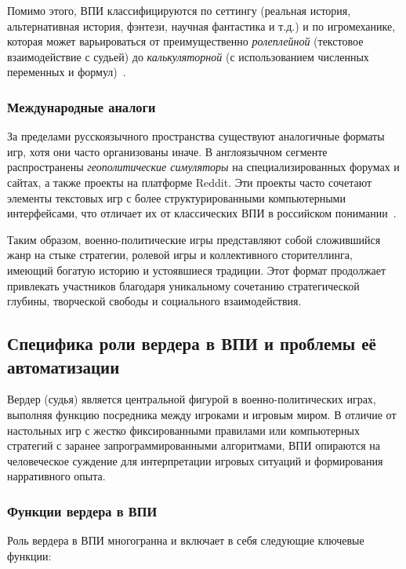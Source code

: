 Помимо этого, ВПИ классифицируются по сеттингу (реальная история, альтернативная история, фэнтези, научная фантастика и т.д.) и по игромеханике, которая может варьироваться от преимущественно \textit{ролеплейной} (текстовое взаимодействие с судьей) до \textit{калькуляторной} (с использованием численных переменных и формул)~\cite{wpg-encyclopedia}.

\subsubsection{Международные аналоги}

За пределами русскоязычного пространства существуют аналогичные форматы игр, хотя они часто организованы иначе. В англоязычном сегменте распространены \textit{геополитические симуляторы} на специализированных форумах и сайтах, а также проекты на платформе Reddit. Эти проекты часто сочетают элементы текстовых игр с более структурированными компьютерными интерфейсами, что отличает их от классических ВПИ в российском понимании~\cite{wpg-dtf}.

Таким образом, военно-политические игры представляют собой сложившийся жанр на стыке стратегии, ролевой игры и коллективного сторителлинга, имеющий богатую историю и устоявшиеся традиции. Этот формат продолжает привлекать участников благодаря уникальному сочетанию стратегической глубины, творческой свободы и социального взаимодействия.

\subsection{Специфика роли вердера в ВПИ и проблемы её автоматизации}

Вердер (судья) является центральной фигурой в военно-политических играх, выполняя функцию посредника между игроками и игровым миром. В отличие от настольных игр с жестко фиксированными правилами или компьютерных стратегий с заранее запрограммированными алгоритмами, ВПИ опираются на человеческое суждение для интерпретации игровых ситуаций и формирования нарративного опыта.

\subsubsection{Функции вердера в ВПИ}

Роль вердера в ВПИ многогранна и включает в себя следующие ключевые функции:

